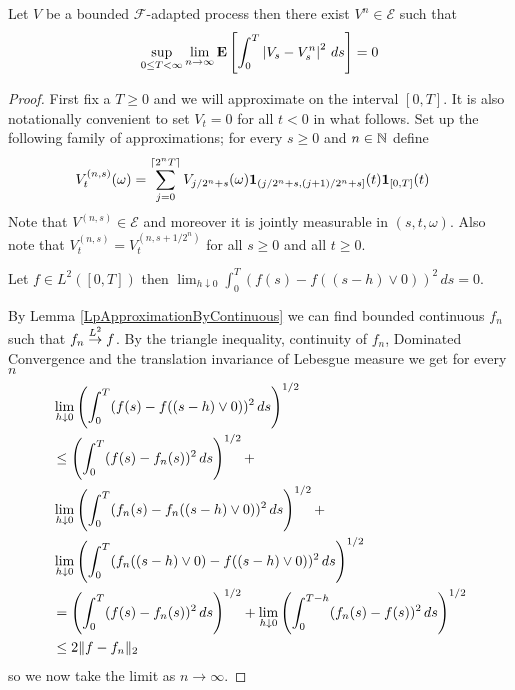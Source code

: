 \begin{lem}\label{SimpleProcessApproximationBoundedLebesgue}Let $V$ be a bounded $\mathcal{F}$-adapted process then there exist $V^n \in \mathcal{E}$ such that 
\begin{align*}
\sup_{0 \leq T < \infty} \lim_{n \to \infty} \textbf{E}\left[\int_0^T \left \vert V_s - V_s^n \right \vert^2 \, ds\right] = 0
\end{align*}
\end{lem}
\begin{proof}
First fix a $T \geq 0$ and we will approximate on the interval $[0,T]$.  It is also notationally convenient to set $V_t = 0$ for all $t < 0$ in what follows.  Set up the following family of approximations; for every $s \geq 0$ and $n \in \mathbb{N}$ define
\begin{align*}
V^{(n,s)}_t(\omega)  &= \sum_{j=0}^{\lceil 2^n T \rceil} V_{j/2^n + s}(\omega) \textbf{1}_{(j/2^n + s, (j+1)/2^n + s]}(t) \textbf{1}_{[0,T]}(t)
\end{align*}
Note that $V^{(n,s)} \in \mathcal{E}$ and moreover it is jointly measurable in $(s,t,\omega)$.  Also note that $V^{(n,s)}_t = V^{(n, s+1/2^n)}_t$ for all $s \geq 0$ and all $t \geq 0$.

\begin{clm}Let $f \in L^2([0,T])$ then $\lim_{h \downarrow 0} \int_0^T (f(s) - f((s - h) \vee 0))^2 \, ds= 0$.
\end{clm}

By Lemma \ref{LpApproximationByContinuous} we can find bounded continuous $f_n$ such that $f_n \overset{L^2}\to f$.  By the triangle inequality, continuity of $f_n$, Dominated Convergence and the translation invariance of Lebesgue measure we get for every $n$
\begin{align*}
&\lim_{h \downarrow 0} \left(\int_0^T (f(s) - f((s - h) \vee 0))^2 \, ds\right)^{1/2} \\
&\leq \left(\int_0^T (f(s) -f_n(s))^2 \, ds\right)^{1/2} + \\
&\lim_{h \downarrow 0} \left(\int_0^T (f_n(s) - f_n((s - h) \vee 0))^2 \, ds\right)^{1/2} + \\
&\lim_{h \downarrow 0} \left(\int_0^T (f_n((s-h) \vee 0) - f((s - h) \vee 0))^2 \, ds\right)^{1/2} \\
&=\left(\int_0^T (f(s) -f_n(s))^2 \, ds\right)^{1/2} + \lim_{h \downarrow 0} \left(\int_0^{T-h} (f_n(s) - f(s))^2 \, ds\right)^{1/2}\\
&\leq 2 \lVert f - f_n \rVert_2
\end{align*}
so we now take the limit as $n \to \infty$.


\end{proof}
